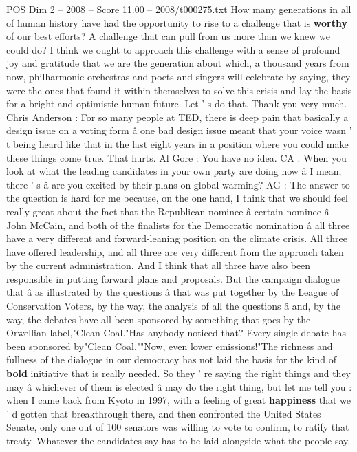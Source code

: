 \begin{textsample}{POS Dim 2 – 2008 – Score 11.00 – 2008/t000275.txt}
How many generations in all of human history have had the opportunity to rise to a challenge that is \textbf{worthy} of our best efforts?
A challenge that can pull from us more than we knew we could do?
I think we ought to approach this challenge with a sense of profound joy and gratitude that we are the generation about which, a thousand years from now, philharmonic orchestras and poets and singers will celebrate by saying, they were the ones that found it within themselves to solve this crisis and lay the basis for a bright and optimistic human future.
Let ' s do that.
Thank you very much.
Chris Anderson : For so many people at TED, there is deep pain that basically a design issue on a voting form â one bad design issue meant that your voice wasn ' t being heard like that in the last eight years in a position where you could make these things come true.
That hurts.
Al Gore : You have no idea.
CA : When you look at what the leading candidates in your own party are doing now â I mean, there ' s â are you excited by their plans on global warming?
AG : The answer to the question is hard for me because, on the one hand, I think that we should feel really great about the fact that the Republican nominee â certain nominee â John McCain, and both of the finalists for the Democratic nomination â all three have a very different and forward-leaning position on the climate crisis.
All three have offered leadership, and all three are very different from the approach taken by the current administration.
And I think that all three have also been responsible in putting forward plans and proposals.
But the campaign dialogue that â as illustrated by the questions â that was put together by the League of Conservation Voters, by the way, the analysis of all the questions â and, by the way, the debates have all been sponsored by something that goes by the Orwellian label,"Clean Coal."Has anybody noticed that?
Every single debate has been sponsored by"Clean Coal.""Now, even lower emissions!"The richness and fullness of the dialogue in our democracy has not laid the basis for the kind of \textbf{bold} initiative that is really needed.
So they ' re saying the right things and they may â whichever of them is elected â may do the right thing, but let me tell you : when I came back from Kyoto in 1997, with a feeling of great \textbf{happiness} that we ' d gotten that breakthrough there, and then confronted the United States Senate, only one out of 100 senators was willing to vote to confirm, to ratify that treaty.
Whatever the candidates say has to be laid alongside what the people say.

\end{textsample}
